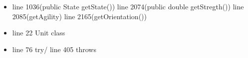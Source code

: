 \documentclass[]{article}
\title{}
\author{}
\begin{document}
\maketitle

\section{}
	\begin{itemize}
		\item line 1036(public State getState())
			  line 2074(public double getStregth())
			  line 2085(getAgility)
			  line 2165(getOrientation())
		\item line 22 Unit class
		\item line 76 try/
			  line 405 throws
			  
	\end{itemize}
\end{document}
